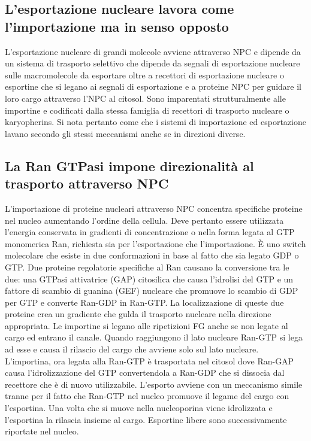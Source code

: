 \subsection{L'esportazione nucleare lavora come l'importazione ma in senso opposto}
L'esportazione nucleare di grandi molecole avviene attraverso NPC e dipende da un sistema di trasporto selettivo che dipende da segnali di esportazione nucleare sulle macromolecole da
esportare oltre a recettori di esportazione nucleare o esportine che si legano ai segnali di esportazione e a proteine NPC per guidare il loro cargo attraverso l'NPC al citosol.
Sono imparentati strutturalmente alle importine e codificati dalla stessa famiglia di recettori di trasporto nucleare o karyopherins. Si nota pertanto come che i sistemi di importazione
ed esportazione lavano secondo gli stessi meccanismi anche se in direzioni diverse.
\subsection{La Ran GTPasi impone direzionalit\`a al trasporto attraverso NPC}
L'importazione di proteine nucleari attraverso NPC concentra specifiche proteine nel nucleo aumentando l'ordine della cellula. Deve pertanto essere utilizzata l'energia conservata in
gradienti di concentrazione o nella forma legata al GTP monomerica Ran, richiesta sia per l'esportazione che l'importazione. \`E uno switch molecolare che esiste in due conformazioni
in base al fatto che sia legato GDP o GTP. Due proteine regolatorie specifiche al Ran causano la conversione tra le due: una GTPasi attivatrice (GAP) citosilica che causa l'idrolisi 
del GTP e un fattore di scambio di guanina (GEF) nucleare che promuove lo scambio di GDP per GTP e converte Ran-GDP in Ran-GTP. La localizzazione di queste due proteine crea un gradiente
che gulda il trasporto nucleare nella direzione appropriata. Le importine si legano alle ripetizioni FG anche se non legate al cargo ed entrano il canale. Quando raggiungono il lato 
nucleare Ran-GTP si lega ad esse e causa il rilascio del cargo che avviene solo sul lato nucleare. L'importina, ora legata alla Ran-GTP \`e trasportata nel citosol dove Ran-GAP causa
l'idrolizzazione del GTP convertendola a Ran-GDP che si dissocia dal recettore che \`e di nuovo utilizzabile. L'esporto avviene con un meccanismo simile tranne per il fatto che Ran-GTP
nel nucleo promuove il legame del cargo con l'esportina. Una volta che si muove nella nucleoporina viene idrolizzata e l'esportina la rilascia insieme al cargo. Esportine libere sono
successivamente riportate nel nucleo.

